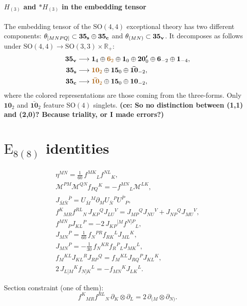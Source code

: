 \documentclass[11pt]{article}
\newcommand{\M}{\ensuremath{\mathcal{M}}\xspace}
\newcommand{\SO}{\ensuremath{\mathrm{SO}}\xspace}
\newcommand{\E}{\ensuremath{\mathrm{E}}\xspace}
\newcommand{\R}{\ensuremath{\mathbb{R}}\xspace}
\newcommand{\ce}[1]{\marginpar{\parbox{\marginparwidth}{\boldmath $\Longleftarrow$}}
{\boldmath\bfseries (ce: #1)}}
\begin{document}
\paragraph{\boldmath $H_{(3)}$ and $*H_{(3)}$ in the embedding tensor} The embedding tensor of the $\SO(4,4)$ exceptional theory has two different components: $\theta_{[MNPQ]}\subset\bm{35_{\rm s}}\oplus\bm{35_{\rm c}}$ and $\theta_{(MN)}\subset\bm{35_{\rm v}}$. It decomposes as follows under $\SO(4,4)\rightarrow\SO(3,3)\times\R_{+}$:
\begin{equation}
  \begin{aligned}
    \bm{35_{\rm v}} &\longrightarrow \bm{1}_{4} \oplus {\color{mydarkorange}\bm{6}_{2}} \oplus \bm{1}_{0} \oplus \bm{20'}_{0} \oplus \bm{6}_{-2} \oplus \bm{1}_{-4},\\
    \bm{35_{\rm s}} &\longrightarrow {\color{mydarkorange}\bm{10}_{2}} \oplus \bm{15}_{0}  \oplus \bm{\bar{10}}_{-2},\\
    \bm{35_{\rm c}} &\longrightarrow {\color{mydarkorange}\bm{\bar{10}}_{2}} \oplus \bm{15}_{0}  \oplus \bm{10}_{-2},
  \end{aligned}
\end{equation}
where the colored representations are those coming from the three-forms. Only $\bm{10}_{2}$ and $\bm{\bar{10}}_{2}$ feature $\SO(4)$ singlets. \ce{So no distinction between (1,1) and (2,0)? Because triality, or I made errors?}

\section{\texorpdfstring{$\E_{8(8)}$}{E8(8)} identities}

\begin{gather}
  \eta^{MN} = \frac{1}{60}\,f^{MK}{}_{L}f^{NL}{}_{K}, \\
  \M^{PM}\M^{QN}f_{PQ}{}^{K} = - f^{MN}{}_{L}\M^{LK}, \\
  J_{\bar M\bar N}{}^{\bar P} = U_{\bar M}{}^{M}\partial_{M}U_{\bar N}{}^{P}U^{\bar P}{}_{P}, \\
  f^{K}{}_{MR}f^{RL}{}_{N}\,J_{KP}{}^{Q}J_{LU}{}^{V} = J_{MP}{}^{Q}J_{NU}{}^{V}+J_{NP}{}^{Q}J_{MU}{}^{V},\\
  f^{MN}{}_{P}J_{KL}{}^{P} = -2\,J_{KP}{}^{[M}f^{N]P}{}_{L}, \\
  J_{MN}{}^{P} = \frac{1}{60} \,f_{N}{}^{PR}f_{RK}{}^{L}J_{ML}{}^{K}, \\
  J_{MN}{}^{P} = -\frac{1}{30} \,f_{N}{}^{KR}f_{R}{}^{P}{}_{L}J_{MK}{}^{L},\\
  f_{M}{}^{KL}J_{KL}{}^{R}J_{RP}{}^{Q} = f_{M}{}^{KL}J_{RQ}{}^{P}J_{KL}{}^{K},\\
  2\,J_{L[M}{}^{K}f_{N]K}{}^{L} = -f_{MN}{}^{K}J_{LK}{}^{L}.
\end{gather}

Section constraint (one of them):
\begin{equation}
  f^{K}{}_{MR}f^{RL}{}_{N} \,\partial_{K}\otimes\partial_{L} = 2\,\partial_{(M}\otimes\partial_{N)}.
\end{equation}



\end{document}
